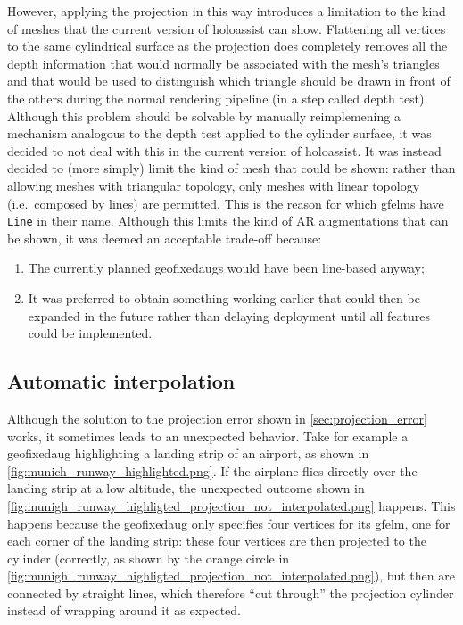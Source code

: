 However, applying the projection in this way introduces a limitation to the kind of meshes that the current version of \gls{holoassist} can show. Flattening all vertices to the same cylindrical surface as the projection does completely removes all the depth information that would normally be associated with the mesh's triangles and that would be used to distinguish which triangle should be drawn in front of the others during the normal rendering pipeline (in a step called depth test\cite{khronos_group_depth_nodate}). Although this problem should be solvable by manually reimplemening a mechanism analogous to the depth test applied to the cylinder surface, it was decided to not deal with this in the current version of \gls{holoassist}. It was instead decided to (more simply) limit the kind of mesh that could be shown: rather than allowing meshes with triangular topology, only meshes with linear topology (i.e.\ composed by lines) are permitted. This is the reason for which \glspl{gfelm} have \texttt{Line} in their name. Although this limits the kind of \gls{AR} augmentations that can be shown, it was deemed an acceptable trade-off because:

\begin{enumerate}
    \item The currently planned \glspl{geofixedaug} would have been line-based anyway;
    \item It was preferred to obtain something working earlier that could then be expanded in the future rather than delaying deployment until all features could be implemented\cite{gabriel_rise_1991}.
\end{enumerate}

\subsection{Automatic interpolation}\label{sec:automatic_interpolation}

Although the solution to the projection error shown in \autoref{sec:projection_error} works, it sometimes leads to an unexpected behavior. Take for example a \gls{geofixedaug} highlighting a landing strip of an airport, as shown in \autoref{fig:munich_runway_highlighted.png}. If the airplane flies directly over the landing strip at a low altitude, the unexpected outcome shown in \autoref{fig:munigh_runway_highligted_projection_not_interpolated.png} happens. This happens because the \gls{geofixedaug} only specifies four vertices for its \gls{gfelm}, one for each corner of the landing strip: these four vertices are then projected to the cylinder (correctly, as shown by the orange circle in \autoref{fig:munigh_runway_highligted_projection_not_interpolated.png}), but then are connected by straight lines, which therefore \enquote{cut through} the projection cylinder instead of wrapping around it as expected.

